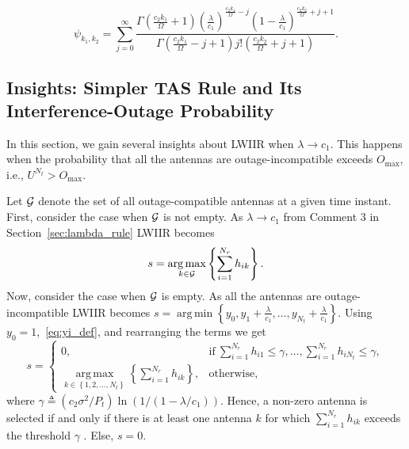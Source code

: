 \documentclass[12pt,draftcls,peerreview,onecolumn]{IEEEtran}
\newcommand{\brac}[1]{\left({#1}\right)}
\newcommand{\define}{\triangleq}
\newcommand{\tendsto}{\to}
\newcommand{\ie}{{i.e.}}
\newcommand{\prob}[1]{\text{Pr}\brac{#1}}
\DeclareMathOperator*{\argmin}{arg\,min}
\DeclareMathOperator*{\argmax}{arg\,max}
\newcommand{\lam}{\lambda}
\newcommand{\goodset}{\cal{G}}
\newcommand{\Nt}{{N_t}}
\newcommand{\Nr}{{N_r}}
\newcommand{\Pt}{{P_t}}
\newcommand{\such}{h}
\newcommand{\puch}{g}
\newcommand{\hk}[1]{{\such_{#1}}}
\newcommand{\gk}[1]{{\puch_{#1}}}
\newcommand{\noisevar}{\sigma^2}
\newcommand{\outmax}{O_{\text{max}}}
\newcommand{\itau}{\tau}
\newcommand{\cone}{c_{1}}
\newcommand{\ctwo}{c_{2}}
\newcommand{\m}{\cone}
\newcommand{\taubypt}{\frac{\itau}{\Pt}}
\newcommand{\gkgrtaubypt}[1]{{\gk{#1}}>\taubypt}
\newcommand{\lambym}{\frac{\lam}{\m}}
\newcommand{\yk}[1]{y_{#1}}
\newcommand{\al}{\ctwo}
\newcommand{\snr}{\Omega}
\newcommand{\albysnr}[1][]{\frac{\al#1}{\snr}}
\newcommand{\un}{U}
\newcommand{\antopts}{\left\{1,2,\ldots,\Nt\right\}}
\newcommand{\igammainline}{{ \left( {\al\noisevar}/{\Pt}\right)  \ln\left({1}/\left( {1-\lam/\m }\right) \right)}}
\newcommand{\psifun}[2]{\psi_{{#1},{#2}}}
\newcommand{\akone}{\albysnr[k_1]}
\newcommand{\lidx}{j}
\newcommand{\sumnr}{\sum_{i=1}^{\Nr}}
\begin{document}
\begin{equation}
\psifun{k_1}{k_2} = \sum_{\lidx=0}^{\infty} \frac{\Gamma\left(\akone+1 \right) \left(\lambym\right)^{\albysnr[k_1]  - \lidx} \left(1-\lambym\right)^{\albysnr[k_2]+\lidx+1}}{\Gamma\left(\akone-\lidx+1 \right)\lidx ! \left(\albysnr[k_2]+\lidx+1\right)}. 
\label{eq:inf_sum}
\end{equation}
%
%

\subsection{Insights: Simpler TAS Rule and Its Interference-Outage Probability}
In this section, we gain several insights about LWIIR when $\lam \tendsto \cone$. This happens when the probability that all the antennas are outage-incompatible exceeds $\outmax$, \ie, $\un^{\Nt}>\outmax$.    %
%

\newcommand{\gammath}{\gamma}
Let $\goodset$ denote the set of all outage-compatible antennas at a given time instant. First, consider the case when $\goodset$  is not empty. As $\lam \tendsto \cone$ from Comment 3 in Section~\ref{sec:lambda_rule} LWIIR becomes 
\begin{equation}
\label{eq:hp_rule}
s = \argmax_{k\in\goodset}\left\lbrace \sumnr \hk{ik}\right\rbrace. 
\end{equation}
Now, consider the case when $\goodset$ is empty. As all the antennas are outage-incompatible LWIIR becomes $s = \argmin\left\lbrace  \yk{0},\yk{1}+\lambym,\ldots,\yk{\Nt}+\lambym \right\rbrace$. Using $\yk{0}=1$,~\eqref{eq:yi_def}, and rearranging the terms we get
\begin{equation}
\label{eq:hp_rule}
s = \left\{
\begin{array}{ll}
0 , & \text{if}~\sumnr\hk{i1}\leq\gammath,\ldots, \sumnr\hk{i\Nt}\leq\gammath, \\
\argmax\limits_{k\in\antopts}\left\lbrace \sumnr\hk{ik}\right\rbrace , &\text{otherwise},
\end{array}\right.
\end{equation}
where $\gammath\define\igammainline$. Hence, a non-zero antenna is selected if and only if there is at least one antenna $k$ for which $\sumnr \hk{ik}$ exceeds the threshold $\gammath$ . Else, $s=0$. 
\end{document}
